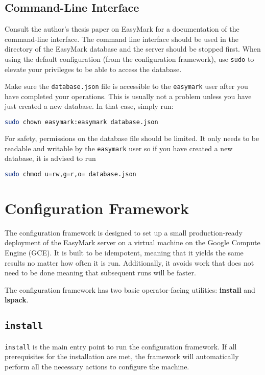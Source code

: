 \documentclass[12pt,a4paper]{report}
\begin{document}
	\section{Command-Line Interface}
	Consult the author's thesis paper on EasyMark for a documentation of the command-line interface. The command line interface should be used in the directory of the EasyMark database and the server should be stopped first. When using the default configuration (from the configuration framework), use \lstinline|sudo| to elevate your privileges to be able to access the database.
	
	Make sure the \lstinline|database.json| file is accessible to the \lstinline|easymark| user after you have completed your operations. This is usually not a problem unless you have just created a new database. In that case, simply run:
	
	\begin{lstlisting}[language=bash]
		sudo chown easymark:easymark database.json
	\end{lstlisting}
	
	For safety, permissions on the database file should be limited. It only needs to be readable and writable by the \lstinline|easymark| user so if you have created a new database, it is advised to run
	
	\begin{lstlisting}[language=bash]
		sudo chmod u=rw,g=r,o= database.json
	\end{lstlisting}

	\chapter{Configuration Framework}
	The configuration framework is designed to set up a small production-ready deployment of the EasyMark server on a virtual machine on the Google Compute Engine (GCE). It is built to be idempotent, meaning that it yields the same results no matter how often it is run. Additionally, it avoids work that does not need to be done meaning that subsequent runs will be faster.
	
	The configuration framework has two basic operator-facing utilities: \textbf{install} and \textbf{lspack}.
	
	\section{\lstinline|install|}
	\lstinline|install| is the main entry point to run the configuration framework. If all prerequisites for the installation are met, the framework will automatically perform all the necessary actions to configure the machine.
	
\end{document}
